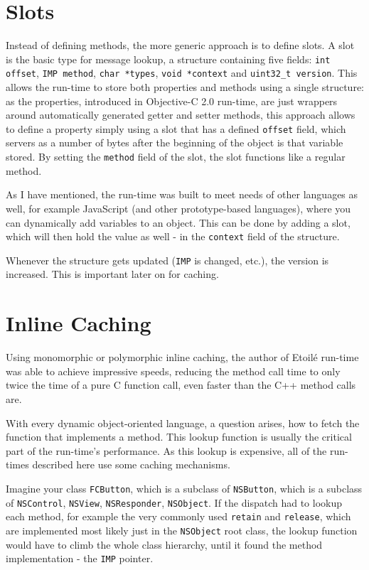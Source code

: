 \section{Slots}
Instead of defining methods, the more generic approach is to define slots. A slot is the basic type for message lookup, a structure containing five fields: \verb=int offset=, \verb=IMP method=, \verb=char *types=, \verb=void *context= and \verb=uint32_t version=. This allows the run-time to store both properties and methods using a single structure: as the properties, introduced in Objective-C 2.0 run-time, are just wrappers around automatically generated getter and setter methods, this approach allows to define a property simply using a slot that has a defined \verb=offset= field, which servers as a number of bytes after the beginning of the object is that variable stored. By setting the \verb=method= field of the slot, the slot functions like a regular method.

As I have mentioned, the run-time was built to meet needs of other languages as well, for example JavaScript (and other prototype-based languages), where you can dynamically add variables to an object. This can be done by adding a slot, which will then hold the value as well - in the \verb=context= field of the structure.

Whenever the structure gets updated (\verb=IMP= is changed, etc.), the version is increased. This is important later on for caching.


\section{Inline Caching}
Using monomorphic or polymorphic inline caching, the author of Etoilé run-time was able to achieve impressive speeds, reducing the method call time to only twice the time of a pure C function call, even faster than the C++ method calls are.

With every dynamic object-oriented language, a question arises, how to fetch the function that implements a method. This lookup function is usually the critical part of the run-time's performance. As this lookup is expensive, all of the run-times described here use some caching mechanisms.

Imagine your class \verb=FCButton=, which is a subclass of \verb=NSButton=, which is a subclass of \verb=NSControl=, \verb=NSView=, \verb=NSResponder=, \verb=NSObject=. If the dispatch had to lookup each method, for example the very commonly used \verb=retain= and \verb=release=, which are implemented most likely just in the \verb=NSObject= root class, the lookup function would have to climb the whole class hierarchy, until it found the method implementation - the \verb=IMP= pointer.


